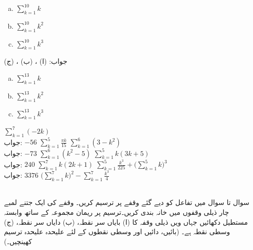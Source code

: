\begin{multicols}{3}
\begin{enumerate}[a.]
\item
$\sum\limits_{k=1}^{10} k$
\item
$\sum\limits_{k=1}^{10}k^2$
\item
$\sum\limits_{k=1}^{10}k^3$
\end{enumerate}
\end{multicols}
جواب:\quad
(ا) ، (ب) ، (ج) 
\begin{multicols}{3}
\begin{enumerate}[a.]
\item
$\sum\limits_{k=1}^{13} k$
\item
$\sum\limits_{k=1}^{13}k^2$
\item
$\sum\limits_{k=1}^{13}k^3$
\end{enumerate}
\end{multicols}
$\sum\limits_{k=1}^7 (-2k)$\\
جواب:\quad
$-56$
$\sum\limits_{k=1}^5 \tfrac{\pi k}{15}$
$\sum\limits_{k=1}^6 (3-k^2)$\\
جواب:\quad
$-73$
$\sum\limits_{k=1}^6 (k^2-5)$
$\sum\limits_{k=1}^5 k(3k+5)$\\
جواب:\quad
$240$
$\sum\limits_{k=1}^7 k(2k+1)$
$\sum\limits_{k=1}^5 \tfrac{k^3}{225}+\big(\sum\limits_{k=1}^5 k\big)^3$\\
جواب:\quad
$3376$
$\big(\sum\limits_{k=1}^7 k\big)^2-\sum\limits_{k=1}^7 \tfrac{k^3}{4}$

\\
سوال  تا سوال  میں تفاعل  کو دیے گئے وقفے پر ترسیم کریں۔ وقفے کی ایک جتنے لمبے چار ذیلی وقفوں میں خانہ بندی کریں۔ترسیم پر ریمان مجموعہ  کے ساتھ وابستہ مستطیل دکھائیں جہاں  ویں  ذیلی وقفہ کا  (ا) بایاں سر نقطہ، (ب) دایاں سر نقطہ، (ج) وسطی نقطہ   ہے۔ (بائیں، دائیں اور وسطی نقطوں کے لئے علیحدہ علیحدہ ترسیم کھینچیں۔)

